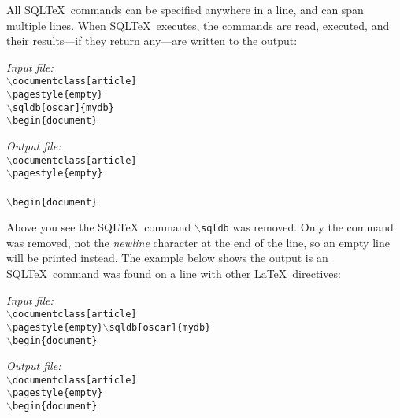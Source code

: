 \documentclass{article}
\newcommand{\bs}{\ensuremath{\backslash}}
\newcommand{\vs}{\vspace{3mm}}
\begin{document}
\vs

All SQL\TeX\ commands can be specified anywhere in a line, and can span multiple lines.
When SQL\TeX\ executes, the commands are read, executed, and their results---if they return
any---are written to the output:

\vs

\begin{minipage}[t]{0.5\textwidth}\textsl{Input file:}\\\texttt{\footnotesize{\bs documentclass[article] \\
\bs pagestyle\{empty\} \\
\bs sqldb[oscar]\{mydb\} \\
\bs begin\{document\} \\
}}\end{minipage}\hfill\begin{minipage}[t]{0.5\textwidth}\textsl{Output file:}\\\texttt{\footnotesize{\bs documentclass[article] \\
\bs pagestyle\{empty\} \\
 \\
\bs begin\{document\} \\
}}\end{minipage}

\vs

Above you see the SQL\TeX\ command \texttt{\bs sqldb} was removed. Only the command was removed, not
the \textsl{newline} character at the end of the line, so an empty line will be printed instead.
The example below shows the output is an SQL\TeX\ command was found on a line with other \LaTeX\
directives:

\vs

\begin{minipage}[t]{0.5\textwidth}\textsl{Input file:}\\\texttt{\footnotesize{\bs documentclass[article] \\
\bs pagestyle\{empty\}\bs sqldb[oscar]\{mydb\} \\
\bs begin\{document\} \\
\hrulefill}}\end{minipage}\hfill\begin{minipage}[t]{0.5\textwidth}\textsl{Output file:}\\\texttt{\footnotesize{\bs documentclass[article] \\
\bs pagestyle\{empty\} \\
\bs begin\{document\} \\
}}\end{minipage}
\end{document}
